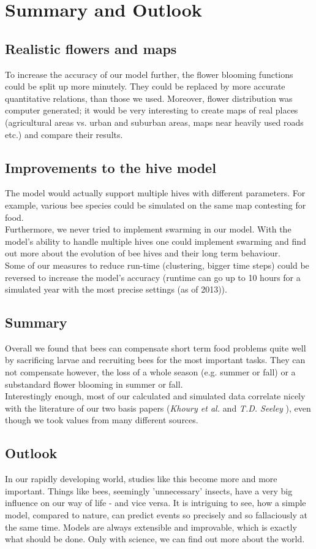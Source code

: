 \section{Summary and Outlook}
\subsection{Realistic flowers and maps}
	To increase the accuracy of our model further, the flower blooming functions could be split up more minutely. They could be replaced by more accurate quantitative relations, than those we used. Moreover, flower distribution was computer generated; it would be very interesting to create maps of real places (agricultural areas vs. urban and suburban areas, maps near heavily used roads etc.) and compare their results.
\subsection{Improvements to the hive model}
	The model would actually support multiple hives with different parameters. For example, various bee species could be simulated on the same map contesting for food. \\Furthermore, we never tried to implement swarming in our model. With the model's ability to handle multiple hives one could implement swarming and find out more about the evolution of bee hives and their long term behaviour. \\Some of our measures to reduce run-time (clustering, bigger time steps) could be reversed to increase the model's accuracy (runtime can go up to 10 hours for a simulated year with the most precise settings (as of 2013)).
\subsection{Summary}
	Overall we found that bees can compensate short term food problems quite well by sacrificing larvae and recruiting bees for the most important tasks. They can not compensate however, the loss of a whole season (e.g. summer or fall) or a substandard flower blooming in summer or fall.\\ Interestingly enough, most of our calculated and simulated data correlate nicely with the literature of our two basis papers (\textit{Khoury et al.} \cite{khoury13} and \textit{T.D. Seeley} \cite{seeley95}), even though we took values from many different sources.
\subsection{Outlook}
	In our rapidly developing world, studies like this become more and more important. Things like bees, seemingly 'unnecessary' insects, have a very big influence on our way of life - and vice versa. It is intriguing to see, how a simple model, compared to nature, can predict events so precisely and so fallaciously at the same time. Models are always extensible and improvable, which is exactly what should be done. Only with science, we can find out more about the world.  